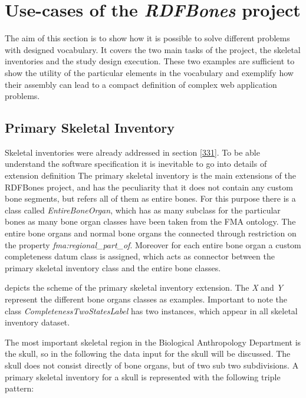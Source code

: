 
\section{Use-cases of the \textit{RDFBones} project}

The aim of this section is to show how it is possible to solve different problems with designed vocabulary. It covers the two main tasks of the project, the skeletal inventories and the study design execution. These two examples are sufficient to show the utility of the particular elements in the vocabulary and exemplify how their assembly can lead to a compact definition of complex web application problems.

\subsection{Primary Skeletal Inventory}

Skeletal inventories were already addressed in section \ref{331}. To be able understand the software specification it is inevitable to go into details of extension definition  The primary skeletal inventory is the main extensions of the RDFBones project, and has the peculiarity that it does not contain any custom bone segments, but refers all of them as entire bones. For this purpose there is a class called \textit{EntireBoneOrgan}, which has as many subclass for the particular bones as many bone organ classes have been taken from the FMA ontology. The entire bone organs and normal bone organs the connected through restriction on the property \textit{fma:regional\_part\_of}. Moreover for each entire bone organ a custom completeness datum class is assigned, which acts as connector between the primary skeletal inventory class and the entire bone classes. 


 depicts the scheme of the primary skeletal inventory extension. The \textit{X} and \textit{Y} represent the different bone organs classes as examples. Important to note the class \textit{CompletenessTwoStatesLabel}  has two instances, which appear in all skeletal inventory dataset.

The most important skeletal region in the Biological Anthropology Department is the skull, so in the following the data input for the skull will be discussed. The skull does not consist directly of bone organs, but of two sub two subdivisions. A primary skeletal inventory for a skull is represented with the following triple pattern: 

